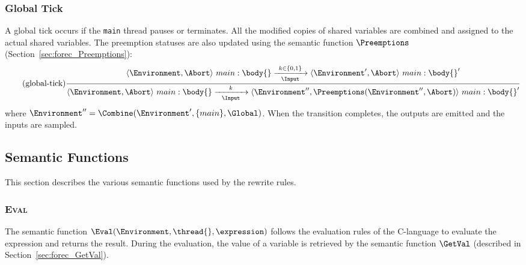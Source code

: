 \subsubsection{Global Tick}
A global tick occurs if the \verb$main$ thread pauses or
terminates. All the modified copies of shared variables 
are combined and assigned to the actual shared variables. 
The preemption statuses 
are also updated using the semantic function $\Preemptions$ 
(Section~\ref{sec:forec_Preemptions}):
\begin{equation*}
	\tag{global-tick}
	\label{forec:global-tick}
	\frac{
			\langle \Environment, \Abort \rangle ~ main:\body{}
				\xrightarrow[~~\Input~~]{k \in \lbrace 0, 1 \rbrace} 
			\langle \Environment', \Abort \rangle ~ main:\body{}'
		}{
			\langle \Environment, \Abort \rangle ~ main:\body{}
				\xrightarrow[~~\Input~~]{k} 
			\langle \Environment'', \Preemptions(\Environment'', \Abort) \rangle ~ main:\body{}'
		}
\end{equation*}
where $\Environment'' = \Combine(\Environment', \lbrace main \rbrace, \Global)$. 
When the transition completes, the outputs are emitted and 
the inputs are sampled.



\subsection{Semantic Functions}
This section describes the various semantic functions 
used by the rewrite rules.

\subsubsection{\textsc{Eval}}
\label{sec:forec_Eval}
The semantic function $\Eval(\Environment, \thread{}, \expression)$ 
follows the evaluation rules of the C-language to 
evaluate the expression \expression{} and returns 
the result. During the evaluation, the value of a 
variable is retrieved by the semantic function $\GetVal$ 
(described in Section~\ref{sec:forec_GetVal}).

